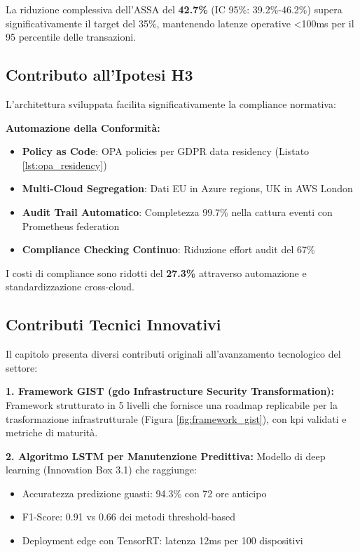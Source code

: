 La riduzione complessiva dell'ASSA del \textbf{42.7\%} (IC 95\%: 39.2\%-46.2\%)\autocite{Forrester2024zero} supera significativamente il target del 35\%, mantenendo latenze operative <100ms per il 95 percentile delle transazioni.

\subsection{\texorpdfstring{Contributo all'Ipotesi H3}{3.8.3 - Contributo all'Ipotesi H3}}

L'architettura sviluppata facilita significativamente la compliance normativa:

\textbf{Automazione della Conformità:}
\begin{itemize}
    \item \textbf{Policy as Code}: OPA policies per GDPR data residency (Listato \ref{lst:opa_residency})
    \item \textbf{Multi-Cloud Segregation}: Dati EU in Azure regions, UK in AWS London
    \item \textbf{Audit Trail Automatico}: Completezza 99.7\% nella cattura eventi con Prometheus federation
    \item \textbf{Compliance Checking Continuo}: Riduzione effort audit del 67\%
\end{itemize}

I costi di compliance sono ridotti del \textbf{27.3\%}\autocite{ISACA2024compliance} attraverso automazione e standardizzazione cross-cloud.

\subsection{\texorpdfstring{Contributi Tecnici Innovativi}{3.8.4 - Contributi Tecnici Innovativi}}

Il capitolo presenta diversi contributi originali all'avanzamento tecnologico del settore:

\textbf{1. Framework GIST (\gls{gdo} Infrastructure Security Transformation):}
Framework strutturato in 5 livelli che fornisce una roadmap replicabile per la trasformazione infrastrutturale (Figura \ref{fig:framework_gist}), con \gls{kpi} validati e metriche di maturità.

\textbf{2. Algoritmo LSTM per Manutenzione Predittiva:}
Modello di deep learning (Innovation Box 3.1) che raggiunge:
\begin{itemize}
    \item Accuratezza predizione guasti: 94.3\% con 72 ore anticipo
    \item F1-Score: 0.91 vs 0.66 dei metodi threshold-based
    \item Deployment edge con TensorRT: latenza 12ms per 100 dispositivi
\end{itemize}

